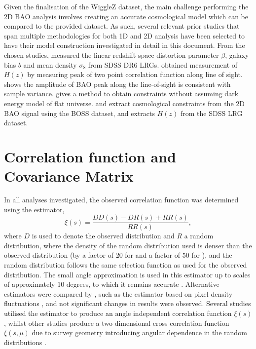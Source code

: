 \documentclass[titlesmallcaps, examinerscopy, copyrightpage]{uqthesis}
\begin{document}
Given the finalisation of the WiggleZ dataset, the main challenge performing the 2D BAO analysis involves creating an accurate cosmological model which can be compared to the provided dataset. As such, several relevant prior studies that span multiple methodologies for both 1D and 2D analysis have been selected to have their model construction investigated in detail in this document. From the chosen studies, \citet{CabreGaztanaga2009} measured the linear redshift space distortion parameter $\beta$, galaxy bias $b$ and mean density $\sigma_8$ from SDSS DR6 LRGs. \citet{Gaztanaga2009} obtained measurement of $H(z)$ by measuring peak of two point correlation function along line of sight. \citet{KazinBlanton2010} shows the amplitude of BAO peak along the line-of-sight is consistent with sample variance. \citet{ChuangWangHemantha2012} gives a method to obtain constraints without assuming dark energy model of flat universe. \citet{SanchezKazinBeutler2013} and \citet{Kazin2010} extract cosmological constraints from the 2D BAO signal using the BOSS dataset, and \citet{Gaztanaga2009} extracts $H(z)$ from the SDSS LRG dataset.


\section{Correlation function and Covariance Matrix}

In all analyses investigated, the observed correlation function was determined using the \citet{LandySzalay1993} estimator,
\begin{equation}
\xi(s) = \frac{DD(s) - DR(s) + RR(s)}{RR(s)},
\end{equation}
where $D$ is used to denote the observed distribution and $R$ a random distribution, where the density of the random distribution used is denser than the observed distribution (by a factor of 20 for \citet{Gaztanaga2009} and a factor of 50 for \citet{SanchezScoccola2012}), and the random distribution follows the same selection function as used for the observed distribution. The small angle approximation is used in this estimator up to scales of approximately 10 degrees, to which it remains accurate \citep{Szapudi2004, Matsubara2000Correlation}. Alternative estimators were compared by \citet{Gaztanaga2009}, such as the estimator based on pixel density fluctuations \citep{BarrigaGaztanaga2002}, and not significant changes in results were observed. Several studies utilised the \citet{LandySzalay1993} estimator to produce an angle independent correlation function $\xi(s)$ \citep{BlakeDavis2011, ChuangWang2012}, whilst other studies produce a two dimensional cross correlation function $\xi(s,\mu)$ due to survey geometry introducing angular dependence in the random distributions \citep{SanchezScoccola2012, SamushiaPercivalGuzzo2011, KazinSanchezBlanton2012}.
\end{document}

